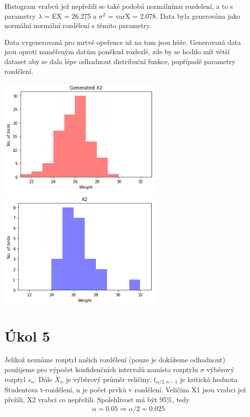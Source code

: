 \documentclass[12pt,a4paper]{article}
\begin{document}
Histogram vrabců jež nepřežili se také podobá normálnímu rozdelení, a to s parametry $\lambda$ = EX = 26.275 a $\sigma ^2$ = varX = 2.078. Data byla generována jako normální normální rozdělení s těmito parametry.

Data vygenerovaná pro mrtvé opeřence už na tom jsou hůře. Generovaná data jsou oproti naměřeným datům poněkud rozlezlé, zde by se hodilo mít větší dataset aby se dala lépe odhadnout distribuční funkce, popřípadě parametry rozdělení.

\includegraphics[width=3.2in]{4_Died_Gen}
\includegraphics[width=3.2in]{4_Died_Data}

\par \bigskip

\section{Úkol 5}

Jelikož neznáme rozptyl našich rozdělení (pouze je dokážeme odhadnout) použijeme pro výpočet konfidenčních intervalů namísto rozptylu $\sigma$ výběrový rozptyl $s_n$. Dále $\bar{X}_n$ je výběrový průměr veličiny, $t_{\alpha/2,n-1}$ je kritická hodnota Studentova t-rozdělení, n je počet prvků v rozdělení. Veličina X1 jsou vrabci jež přežili, X2 vrabci co nepřežili.  Spolehlivost má být 95\%, tedy 
\begin{align*}
\alpha = 0.05 \Rightarrow \alpha/2 = 0.025
\end{align*}
\end{document}
